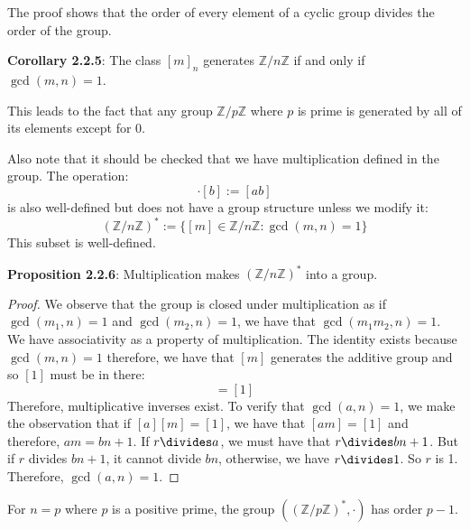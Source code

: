 \documentclass{report}
\begin{document}
The proof shows that the order of every element of a cyclic group divides the order of the group.

\textbf{Corollary 2.2.5}: The class $[m]_{n}$ generates $\mathbb{Z}/n\mathbb{Z}$ if and only if $\gcd(m, n) = 1$.

This leads to the fact that any group $\mathbb{Z}/p\mathbb{Z}$ where $p$ is prime is generated by all of its elements except for $0$.

Also note that it should be checked that we have multiplication defined in the group. The operation:
    \begin{equation*}
        [a] \cdot [b] := [ab]
    \end{equation*}
is also well-defined but does not have a group structure unless we modify it:
    \begin{equation*}
        (\mathbb{Z}/n\mathbb{Z})^{*} := \{[m] \in \mathbb{Z}/n\mathbb{Z} : \gcd(m, n) = 1\}
    \end{equation*}
This subset is well-defined.

\textbf{Proposition 2.2.6}: Multiplication makes $(\mathbb{Z}/n\mathbb{Z})^{*}$ into a group.
    \begin{proof}
        We observe that the group is closed under multiplication as if $\gcd(m_{1}, n) = 1$ and $\gcd(m_{2}, n) = 1$, we have that $\gcd(m_{1}m_{2}, n) = 1$. We have associativity as a property of multiplication. The identity exists because $\gcd(m, n) = 1$ therefore, we have that $[m]$ generates the additive group and so $[1]$ must be in there:
            \begin{equation*}
                [m][a] = [1]
            \end{equation*}
        Therefore, multiplicative inverses exist. To verify that $\gcd(a, n) = 1$, we make the observation that if $[a][m] = [1]$, we have that $[am] = [1]$ and therefore, $am = bn + 1$. If $r \divides a$, we must have that $r \divides bn + 1$. But if $r$ divides $bn + 1$, it cannot divide $bn$, otherwise, we have $r \divides 1$. So $r$ is 1. Therefore, $\gcd(a, n) = 1$.
    \end{proof}

For $n = p$ where $p$ is a positive prime, the group $((\mathbb{Z}/ p\mathbb{Z})^{*}, \cdot)$ has order $p - 1$.
\end{document}
